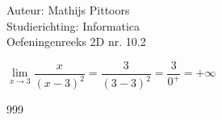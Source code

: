 \documentclass[a4paper]{article}
\newcommand{\llim}{\lim\limits_}
\begin{document}
  
\noindent \large Auteur: Mathijs Pittoors \\
\noindent \large Studierichting: Informatica\\
\noindent \large Oefeningenreeks 2D nr. 10.2\\

\medskip

\normalsize

$\llim{x \rightarrow 3} \dfrac{x}{\left( x - 3\right)^2} = \dfrac{3}{(3-3)^2} = \dfrac{3}{0^+} = + \infty$

\begin{thebibliography}{999}
\end{thebibliography}
\end{document}
